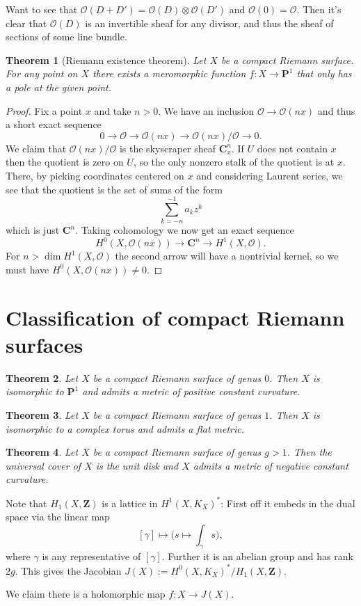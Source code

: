 \documentclass[11pt]{article}
\newtheorem{theo}{Theorem}[section]
\theoremstyle{definition}
\newcommand{\cc}[1]{\mathcal{#1}}
\def\CC{\mathbf{C}}
\def\ZZ{\mathbf{Z}}
\def\PP{\mathbf{P}}
\begin{document}
Want to see that $\cc O(D + D') = \cc O(D) \otimes \cc O(D')$
and $\cc O(0) = \cc O$.
Then it's clear that $\cc O(D)$ is an invertible sheaf for any divisor,
and thus the sheaf of sections of some line bundle.



\begin{theo}[Riemann existence theorem]
Let $X$ be a compact Riemann surface.
For any point on $X$ there exists a meromorphic function $f : X \to \PP^1$
that only has a pole at the given point.
\end{theo}


\begin{proof}
Fix a point $x$ and take $n > 0$.
We have an inclusion $\cc O \to \cc O(nx)$  and thus a short exact sequence
$$
0 \longrightarrow \cc O 
\longrightarrow \cc O(nx)
\longrightarrow \cc O(nx) / \cc O
\longrightarrow 0.
$$
We claim that $\cc O(nx) / \cc O$ is the skyscraper sheaf $\CC^n_x$.
If $U$ does not contain $x$ then the quotient is zero on $U$, so the only
nonzero stalk of the quotient is at $x$.
There, by picking coordinates centered on $x$ and considering Laurent series,
we see that the quotient is the set of sums of the form
$$
\sum_{k = -n}^{-1} a_k z^k
$$
which is just $\CC^n$.
Taking cohomology we now get an exact sequence
$$
H^0(X, \cc O(nx)) \longrightarrow
\CC^n \longrightarrow 
H^1(X, \cc O).
$$
For $n > \dim H^1(X, \cc O)$ the second arrow will have a nontrivial kernel,
so we must have $H^0(X, \cc O(nx)) \not= 0$.
\end{proof}





\section{Classification of compact Riemann surfaces}


\begin{theo}
Let $X$ be a compact Riemann surface of genus $0$.
Then $X$ is isomorphic to $\PP^1$ and admits a metric of positive constant
curvature.
\end{theo}


\begin{theo}
Let $X$ be a compact Riemann surface of genus $1$.
Then $X$ is isomorphic to a complex torus and admits a flat metric.
\end{theo}


\begin{theo}
Let $X$ be a compact Riemann surface of genus $g > 1$.
Then the universal cover of $X$ is the unit disk and $X$ admits a metric
of negative constant curvature.
\end{theo}


Note that $H_1(X,\ZZ)$ is a lattice in $H^1(X, K_X)^*$:
First off it embeds in the dual space via the linear map
$$
[\gamma] \mapsto \biggl(s \mapsto \int_\gamma s\biggr),
$$
where $\gamma$ is any representative of $[\gamma]$.
Further it is an abelian group and has rank $2g$.
This gives the Jacobian $J(X) := H^0(X, K_X)^* / H_1(X, \ZZ)$.

We claim there is a holomorphic map $f : X \to J(X)$.
\end{document}
